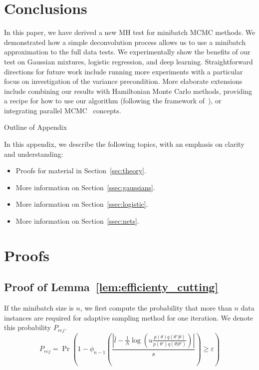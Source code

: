 \documentclass{article}
\begin{document}
\section{Conclusions}\label{sec:conclusion}

In this paper, we have derived a new MH test for minibatch MCMC methods. We demonstrated how a
simple deconvolution process allows us to use a minibatch approximation to the full data tests. We
experimentally show the benefits of our test on Gaussian mixtures, logistic regression, and deep
learning.  Straightforward directions for future work include running more experiments with a
particular focus on investigation of the variance precondition.  More elaborate extensions include
combining our results with Hamiltonian Monte Carlo methods, providing a recipe for how to use our
algorithm (following the framework of~\cite{sgmcmc_2015}), or integrating parallel
MCMC~\cite{conf/uai/AngelinoKWSA14,conf/icml/AhnSW14} concepts.


\small


\normalsize

\clearpage
\appendix

\begin{center}
{\Large Outline of Appendix}
\end{center}

In this appendix, we describe the following topics, with an emphasis on clarity and understanding:

\begin{itemize}[noitemsep]
    \item Proofs for material in Section~\ref{sec:theory}.
    \item More information on Section~\ref{ssec:gaussians}.
    \item More information on Section~\ref{ssec:logistic}.
    \item More information on Section~\ref{ssec:nets}.
\end{itemize}

\section{Proofs}\label{app:proofs}

\subsection{Proof of Lemma~\ref{lem:efficienty_cutting}}\label{app:lem_efficiency}

If the minibatch size is $n$, we first compute the probability that more than $n$ data instances are required for adaptive sampling method for one iteration. We denote this probability $P_{rej}$.
\[P_{rej} = \Pr \left ( 1-\phi_{n-1} \left( \frac{|\bar{l} - \frac{1}{N} \log (u\frac{p(\theta)q(\theta'|\theta)}{p(\theta')q(\theta|\theta')})|}{s} \right )  \geq \varepsilon \right ) \] 
\end{document}
